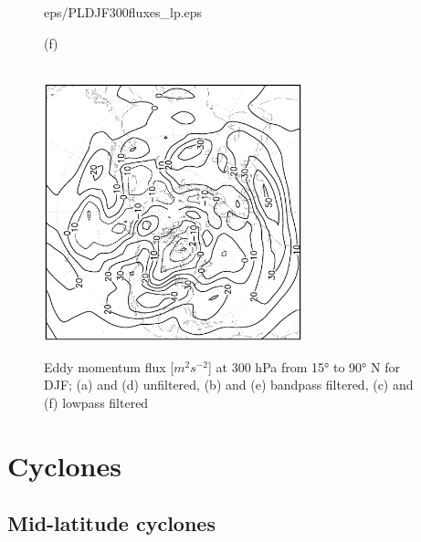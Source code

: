 \documentclass[12pt,a4paper,twoside,openright,headinclude,liststotoc,bibtotoc]{scrreprt}
\begin{document}
\begin{figure}[b]
{{eps/PLDJF300fluxes_lp.eps}
}
\parbox{8.5cm}{\hspace{0.95cm}\begin{scriptsize}(f)\end{scriptsize} \vspace{-0.2cm} \\
\includegraphics[height=7.5cm,angle=-90]
{eps/ERADJF300fluxes_lp.eps}
}
\caption[Eddy momentum flux at 300 hPa for DJF]{Eddy momentum flux [$m^{2}s^{-2}$] at 300 hPa from 15° to 90° N for DJF; (a) and (d) unfiltered, (b) and (e) bandpass filtered, (c) and (f) lowpass filtered}
\label{img:uvDJF}
\end{figure}

\vspace{-0.4cm}
\chapter{Cyclones}
\vspace{-0.4cm}
\section{Mid-latitude cyclones}
\vspace{-0.4cm}
\end{document}
